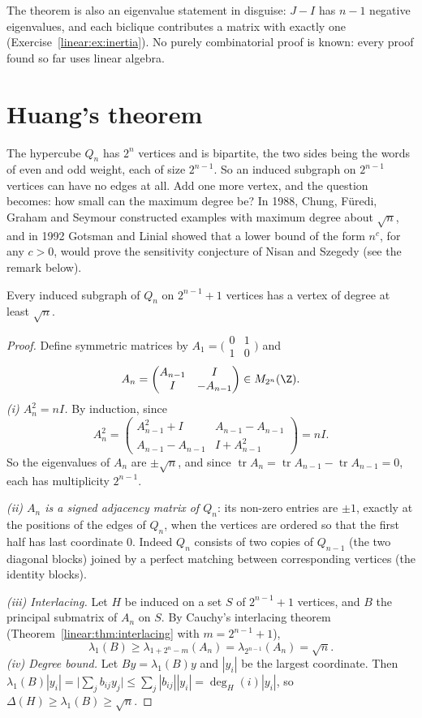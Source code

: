 The theorem is also an eigenvalue statement in disguise: $J-I$ has $n-1$ negative eigenvalues, and each biclique contributes a
matrix with exactly one (Exercise~\ref{linear:ex:inertia}). No purely combinatorial proof is known: every proof found so far uses linear
algebra.

\section{Huang's theorem}

The hypercube $Q_n$ has $2^n$ vertices and is bipartite, the two sides being the words of even and odd weight, each of size
$2^{n-1}$. So an induced subgraph on $2^{n-1}$ vertices can have no edges at all. Add one more vertex, and the question becomes:
how small can the maximum degree be? In 1988, Chung, F\"uredi, Graham and Seymour constructed examples with maximum degree about
$\sqrt n$, and in 1992 Gotsman and Linial showed that a lower bound of the form $n^c$, for any $c>0$, would prove the sensitivity
conjecture of Nisan and Szegedy (see the remark below).

\begin{theorem}[Huang, 2019]\label{linear:thm:huang}
Every induced subgraph of $Q_n$ on $2^{n-1}+1$ vertices has a vertex of degree at least $\sqrt n$.
\end{theorem}
\begin{proof}
Define symmetric matrices by $A_1=\bigl(\begin{smallmatrix}0&1\\1&0\end{smallmatrix}\bigr)$ and
\[
A_n=\begin{pmatrix}A_{n-1}&I\\I&-A_{n-1}\end{pmatrix}\in M_{2^n}(\Z).
\]
\emph{(i) $A_n^2=nI$.} By induction, since
\[
A_n^2=\begin{pmatrix}A_{n-1}^2+I&A_{n-1}-A_{n-1}\\A_{n-1}-A_{n-1}&I+A_{n-1}^2\end{pmatrix}=nI.
\] So the eigenvalues of $A_n$ are $\pm\sqrt n$, and since $\operatorname{tr}A_n=\operatorname{tr}A_{n-1}-
\operatorname{tr}A_{n-1}=0$, each has multiplicity $2^{n-1}$.

\emph{(ii) $A_n$ is a signed adjacency matrix of $Q_n$}: its non-zero entries are $\pm1$, exactly at the positions of the edges of $Q_n$,
when the vertices are ordered so that the first half has last coordinate $0$. Indeed $Q_n$ consists of two copies of $Q_{n-1}$ (the two
diagonal blocks) joined by a perfect matching between corresponding vertices (the identity blocks).

\emph{(iii) Interlacing.} Let $H$ be induced on a set $S$ of $2^{n-1}+1$ vertices, and $B$ the principal submatrix of $A_n$ on $S$. By
Cauchy's interlacing theorem (Theorem~\ref{linear:thm:interlacing} with $m=2^{n-1}+1$),
\[
\lambda_1(B)\ge\lambda_{1+2^n-m}(A_n)=\lambda_{2^{n-1}}(A_n)=\sqrt n.
\]
\emph{(iv) Degree bound.} Let $By=\lambda_1(B)y$ and $|y_i|$ be the largest coordinate. Then $\lambda_1(B)|y_i|=\bigl|\sum_jb_{ij}y_j\bigr|\le
\sum_j|b_{ij}||y_i|=\deg_H(i)|y_i|$, so $\Delta(H)\ge\lambda_1(B)\ge\sqrt n$.
\end{proof}

